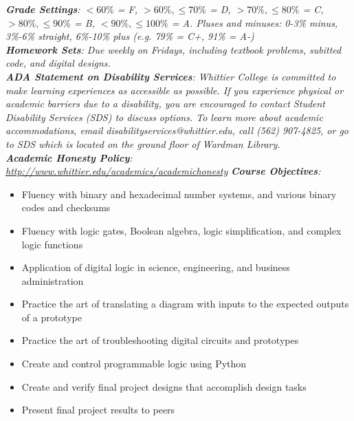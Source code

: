 \documentclass[10pt]{article}
\begin{document}
\textit{\textbf{Grade Settings}: $<60\%$ = F, $>60\%,\leq 70\%$ = D, $>70\%,\leq80\%$ = C, $>80\%,\leq 90\%$ = B, $<90\%,\leq 100\%$ = A.  Pluses and minuses: 0-3\% minus, 3\%-6\% straight, 6\%-10\% plus (e.g. 79\% = C+, 91\% = A-)} \\
\textit{\textbf{Homework Sets}: Due weekly on Fridays, including textbook problems, subitted code, and digital designs.} \\
\textit{\textbf{ADA Statement on Disability Services}: Whittier College is committed to make learning experiences as accessible as possible. If you experience physical or academic barriers due to a disability, you are encouraged to contact Student Disability Services (SDS) to discuss options. To learn more about academic accommodations, email disabilityservices@whittier.edu, call (562) 907-4825, or go to SDS which is located on the ground floor of Wardman Library.} \\
\textit{\textbf{Academic Honesty Policy}: \url{http://www.whittier.edu/academics/academichonesty}}
\clearpage
\textit{\textbf{Course Objectives}:}
\begin{itemize}
\item Fluency with binary and hexadecimal number systems, and various binary codes and checksums
\item Fluency with logic gates, Boolean algebra, logic simplification, and complex logic functions
\item Application of digital logic in science, engineering, and business administration
\item Practice the art of translating a diagram with inputs to the expected outputs of a prototype
\item Practice the art of troubleshooting digital circuits and prototypes
\item Create and control programmable logic using Python
\item Create and verify final project designs that accomplish design tasks
\item Present final project results to peers
\end{itemize}
\end{document}
